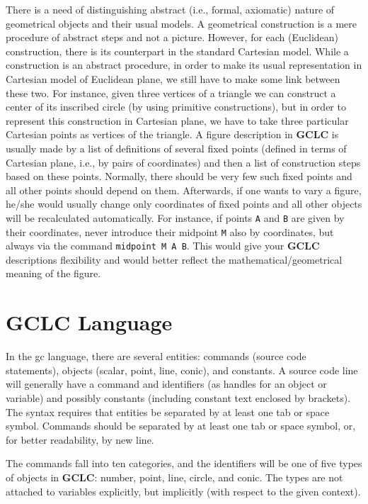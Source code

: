 \documentclass[a4paper]{book}
\newcommand{\gclc}{{\bfseries GCLC}\xspace}
\begin{document}
There is a need of distinguishing abstract (i.e., formal, axiomatic)
nature of geometrical objects and their usual models. A geometrical
construction is a mere procedure of abstract steps and not a picture.
However, for each (Euclidean) construction, there is its counterpart
in the standard Cartesian model. While a construction is an abstract
procedure, in order to make its usual representation in Cartesian
model of Euclidean plane, we still have to make some link between
these two. For instance, given three vertices of a triangle we can
construct a center of its inscribed circle (by using primitive
constructions), but in order to represent this construction in
Cartesian plane, we have to take three particular Cartesian points
as vertices of the triangle. A figure description in \gclc{} is
usually made by a list of definitions of several fixed points
(defined in terms of Cartesian plane, i.e., by pairs of coordinates) 
and then a list of construction steps based on these points.
Normally, there should be very few such fixed points and all other
points should depend on them. Afterwards, if one wants to vary a
figure, he/she would usually change only coordinates of fixed
points and all other objects will be recalculated automatically.
For instance, if points \verb|A| and \verb|B| are given by their
coordinates, never introduce their midpoint \verb|M| also by
coordinates, but always via the command \verb|midpoint M A B|.
This would give your \gclc{} descriptions flexibility and would
better reflect the mathematical/geometrical meaning of the figure.


\chapter{\gclc Language}
\label{sec:gclc-language}

In the {\sc gc} language, there are several entities: commands
(source code statements), objects (scalar, point, line, conic),
and constants. A source code line will generally have a command
and identifiers (as handles for an object or variable) and possibly
constants (including constant text enclosed by brackets). The
syntax requires that entities be separated by at least one tab
or space symbol. Commands should be separated by at least one tab
or space symbol, or, for better readability, by new line.

The commands fall into ten categories, and the identifiers will
be one of five types of objects in \gclc: {\sc number}, {\sc point},
{\sc line}, {\sc circle}, and {\sc conic}. The types are not
attached to variables explicitly, but implicitly (with respect to
the given context).
\end{document}
